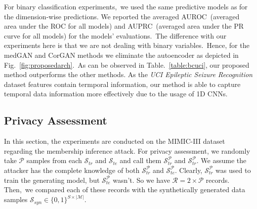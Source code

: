 \documentclass[letterpaper]{article} \usepackage{aaai20}  \usepackage{times}  \usepackage{helvet} \usepackage{courier}  \usepackage[hyphens]{url}  \usepackage{graphicx} \urlstyle{rm} \def\UrlFont{\rm}  \usepackage{graphicx}  \frenchspacing  \setlength{\pdfpagewidth}{8.5in}  \setlength{\pdfpageheight}{11in}
\begin{document}
For binary classification experiments,~we used the same predictive models as for the dimension-wise predictions. We reported the averaged AUROC~(averaged area under the ROC for all models) and AUPRC~(averaged area under the PR curve for all models) for the models' evaluations.~The difference with our experiments here is that we are not dealing with binary variables.~Hence, for the medGAN and CorGAN methods we eliminate the autoencoder as depicted in Fig.~\ref{fig:proposedarch}.~As can be observed in Table.~\ref{table:bcuci}, our proposed method outperforms the other methods. As the \textit{UCI Epileptic Seizure Recognition} dataset features contain termporal information, our method is able to capture temporal data information more effectively due to the usage of 1D CNNs.


\begin{table}[t]
\caption{Comparison of different generative models for binary classification. The averaged AUROC and AUROC for utilizing the predictive models on the real data are \textbf{0.95} and \textbf{0.46}.}
\centering
{}
\label{table:bcuci}
\end{table}


\subsection{Privacy Assessment}\label{sec:Experimentssub:privacy}

In this section, the experiments are conducted on the MIMIC-III dataset regarding the membership inference attack. For privacy assessment, we randomly take $\mathcal{P}$ samples from each $\mathcal{S}_{tr}$ and $\mathcal{S}_{te}$ and call them $\mathcal{S}^{\mathcal{P}}_{tr}$ and $\mathcal{S}^{\mathcal{P}}_{tr}$. We assume the attacker has the complete knowledge of both $\mathcal{S}^{\mathcal{P}}_{tr}$ and $\mathcal{S}^{\mathcal{P}}_{te}$. Clearly, $\mathcal{S}^{\mathcal{P}}_{tr}$ was used to train the generating model, but $\mathcal{S}^{\mathcal{P}}_{te}$ wasn't. So we have $\mathcal{R} = 2 \times \mathcal{P}$ records. Then,~we compared each of these records with the synthetically generated data samples $\mathcal{S}_{syn} \in \{0,1\}^{S \times |\mathcal{M}|}$.
\end{document}
